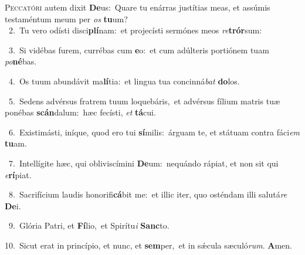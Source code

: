 \lettrine{\initial\textcolor{\initialcolor}{P}}{eccatóri} autem dixit \textbf{De}\-us:~\star Quare tu enárras justítias meas, et assúmis testaméntum meum per \textit{os} \textbf{tu}\-um?\\
{\numbfont\textcolor{\numbcolor}{~2.}}~Tu vero odísti disci\-\textbf{plí}\-nam:~\star et projecísti sermónes meos \textit{re}\-\textbf{trór}sum:\par
{\numbfont\textcolor{\numbcolor}{~3.}}~Si vidébas furem, currébas cum \textbf{e}\-o:~\star et cum adúlteris portiónem tuam \textit{po}\-\textbf{né}bas.\par
{\numbfont\textcolor{\numbcolor}{~4.}}~Os tuum abundávit ma\-\textbf{lí}\-tia:~\star et lingua tua concinná\textit{bat} \textbf{do}\-los.\par
{\numbfont\textcolor{\numbcolor}{~5.}}~Sedens advérsus fratrem tuum loquebáris,~\dagger et advérsus fílium matris tuæ ponébas \textbf{scán}\-dalum:~\star hæc fecísti, \textit{et} \textbf{tá}\-cui.\par
{\numbfont\textcolor{\numbcolor}{~6.}}~Existimásti, iníque, quod ero tui \textbf{sí}\-milis:~\star árguam te, et státuam contra fáci\textit{em} \textbf{tu}\-am.\par
{\numbfont\textcolor{\numbcolor}{~7.}}~Intellígite hæc, qui obliviscímini \textbf{De}\-um:~\star nequándo rápiat, et non sit qui \textit{e}\-\textbf{rí}piat.\par
{\numbfont\textcolor{\numbcolor}{~8.}}~Sacrifícium laudis honorifi\-\textbf{cá}\-bit me:~\star et illic iter, quo osténdam illi salutá\textit{re} \textbf{De}\-i.\par
{\numbfont\textcolor{\numbcolor}{~9.}}~Glória Patri, et \textbf{Fí}\-lio,~\star et Spirítu\textit{i} \textbf{Sanc}\-to.\par
{\numbfont\textcolor{\numbcolor}{10.}}~Sicut erat in princípio, et nunc, et \textbf{sem}\-per,~\star et in sǽcula sæculó\-\textit{rum}\-. \textbf{A}\-men.\par
